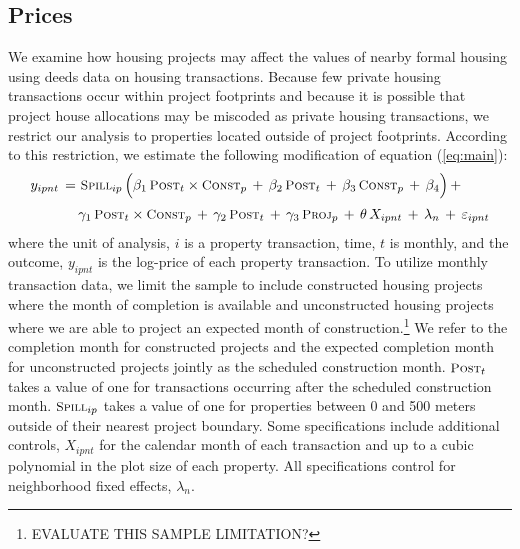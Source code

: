 \documentclass[12pt]{article}
\begin{document}
\subsection{Prices}\label{section:resultsprices}


We examine how housing projects may affect the values of nearby formal housing using deeds data on housing transactions.  Because few private housing transactions occur within project footprints and because it is possible that project house allocations may be miscoded as private housing transactions, we restrict our analysis to properties located outside of project footprints.  According to this restriction, we estimate the following modification of equation (\ref{eq:main}):
\begin{align}\label{eq:mainprice}
\begin{split}
\quad y_{ipnt} \, =& \,\, \textsc{\small Spill}_{ip} \, \Big( \beta_1 \, \textsc{\small Post}_{t}\times\textsc{\small Const}_{p} \, + \, \beta_2 \, \textsc{\small Post}_{t} \, + \, \beta_3 \, \textsc{\small Const}_{p} \, +\, \beta_4 \Big) \, + \\[.2em]
& \, \gamma_1 \,  \textsc{\small Post}_{t}\times\textsc{\small Const}_{p} \, + \, \gamma_2 \,\textsc{\small Post}_{t} \, + \, \gamma_3 \,  \textsc{\small Proj}_{p} \, + \, \theta \, X_{ipnt} \, + \, \lambda_n \, + \, \varepsilon_{ipnt} \quad 
\end{split}
\end{align}
\noindent where the unit of analysis, $i$ is a property transaction, time, $t$ is monthly, and the outcome, $y_{ipnt}$ is the log-price of each property transaction.  To utilize monthly transaction data, we limit the sample to include constructed housing projects where the month of completion is available and unconstructed housing projects where we are able to project an expected month of construction.\footnote{EVALUATE THIS SAMPLE LIMITATION?}  We refer to the completion month for constructed projects and the expected completion month for unconstructed projects jointly as the scheduled construction month.  $\textsc{\small Post}_{t}$ takes a value of one for transactions occurring after the scheduled construction month.  $\textsc{\small Spill}_{ip}$ takes a value of one for properties between 0 and 500 meters outside of their nearest project boundary.  Some specifications include additional controls, $X_{ipnt}$  for the calendar month of each transaction and up to a cubic polynomial in the plot size of each property.  All specifications control for neighborhood fixed effects, $\lambda_n$.  
\end{document}
